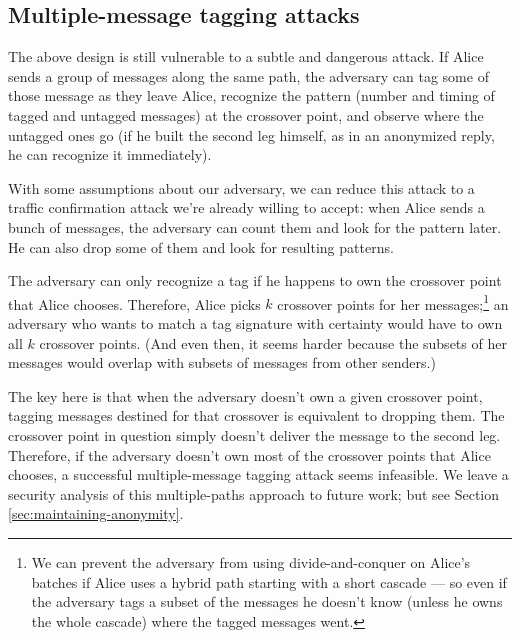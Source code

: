 \documentclass{llncs}
\begin{document}
\subsection{Multiple-message tagging attacks}
\label{subsec:multi-tagging}

The above design is still vulnerable to a subtle and dangerous
attack. If Alice sends a group of messages along the same path, the
adversary can tag some of those message as they leave Alice, recognize
the pattern (number and timing of tagged and untagged messages) at the
crossover point, and observe where the untagged ones go (if he built
the second leg himself, as in an anonymized reply, he can recognize
it immediately).

With some assumptions about our adversary, we can reduce
this attack to a traffic confirmation attack we're already willing to
accept: when Alice sends a bunch of messages, the adversary can count
them and look for the pattern later. He can also drop some of them and
look for resulting patterns.

The adversary can only recognize a tag if he happens to own the crossover
point that Alice chooses.
Therefore, Alice picks $k$ crossover points for her
messages;\footnote{
  We can prevent the adversary from using divide-and-conquer on Alice's
  batches if Alice uses a hybrid path starting with a short cascade ---
  so even if the adversary tags a subset of the messages he doesn't know
  (unless he owns the whole cascade) where the tagged messages went.
}
an adversary who wants to match a tag signature with certainty would
have to own all $k$ crossover points.  (And even then, it seems harder
because the subsets of her messages would overlap with subsets of
messages from other senders.)


The key here is that when the adversary doesn't own a given crossover
point, tagging messages destined for that crossover is equivalent to
dropping them.  The crossover point in question simply doesn't deliver
the message to the second leg. Therefore, if the adversary doesn't own
most of the crossover points that Alice chooses, a successful
multiple-message tagging attack seems infeasible.  We leave a security
analysis of this multiple-paths approach to future work; but see
Section \ref{sec:maintaining-anonymity}.
\end{document}
